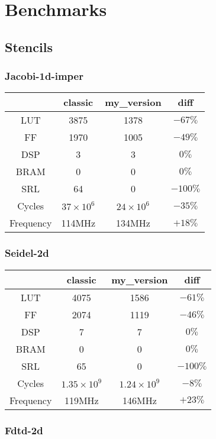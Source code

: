 \documentclass[10pt,a4paper,twoside]{article}
\author{Victor Lezaud}
\title{}
\begin{document}
\section{Benchmarks}
\subsection{Stencils}

\subsubsection{Jacobi-1d-imper}

\begin{tabular}{c|c|c|c}
     & classic & my\_version & diff \\
    \hline
    LUT & 3875 & 1378 & $-67\%$ \\
    \hline
    FF & 1970 & 1005 & $-49\%$ \\
    \hline
    DSP & 3 & 3 & $0\%$ \\
    \hline
    BRAM & 0 & 0 & $0\%$ \\
    \hline
    SRL & 64 & 0 & $-100\%$ \\
    \hline
    Cycles & $37 \times 10^6$ & $24 \times 10^6$ & $-35\%$ \\
    \hline
    Frequency & 114MHz & 134MHz &  $+18\%$\\
\end{tabular}

\subsubsection{Seidel-2d}

\begin{tabular}{c|c|c|c}
     & classic & my\_version & diff \\
    \hline
    LUT & 4075 & 1586 & $-61\%$ \\
    \hline
    FF & 2074 & 1119 & $-46\%$ \\
    \hline
    DSP & 7 & 7 & $0\%$ \\
    \hline
    BRAM & 0 & 0 & $0\%$ \\
    \hline
    SRL & 65 & 0 & $-100\%$ \\
    \hline
    Cycles & $1.35 \times 10^9$ & $1.24 \times 10^9$ & $-8\%$ \\
    \hline
    Frequency & 119MHz & 146MHz &  $+23\%$\\
\end{tabular}

\subsubsection{Fdtd-2d}
\end{document}
